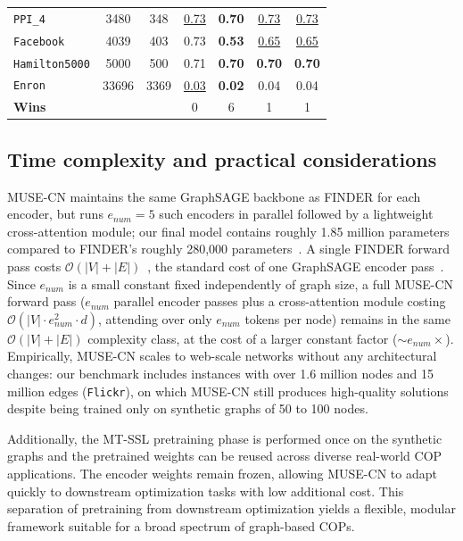 \documentclass{article}
\begin{document}
\begin{table}[!ht]
\begin{minipage}{0.49\linewidth}
{\begin{tabular}{l|c|c|c|c|c|c}
                        \texttt{PPI\_4} & 3480 & 348 & \underline{0.73} & \textbf{0.70} & \underline{0.73} & \underline{0.73} \\
                        \texttt{Facebook} & 4039 & 403 & 0.73 & \textbf{0.53} & \underline{0.65} & \underline{0.65} \\
                        \texttt{Hamilton5000} & 5000 & 500 & 0.71 & \textbf{0.70} & \textbf{0.70} & \textbf{0.70} \\
                        \texttt{Enron} & 33696 & 3369 & \underline{0.03} & \textbf{0.02} & 0.04 & 0.04 \\
                        \hline
                        \textbf{Wins} & &  & 0 & 6 & 1 & 1 \\
                        \end{tabular}
                    }
    \end{minipage}
    \end{table}



\subsection{Time complexity and practical considerations}
MUSE-CN maintains the same GraphSAGE backbone as FINDER for each encoder, but runs $e_{num}=5$ such encoders in parallel followed by a lightweight cross-attention module; our final model contains roughly 1.85 million parameters compared to FINDER’s roughly 280,000 parameters~\cite{fan2020finding}. A single FINDER forward pass costs $\mathcal{O}(|V|+|E|)$~\cite{fan2020finding}, the standard cost of one GraphSAGE encoder pass~\cite{hamilton2017inductive}. Since $e_{num}$ is a small constant fixed independently of graph size, a full MUSE-CN forward pass ($e_{num}$ parallel encoder passes plus a cross-attention module costing $\mathcal{O}(|V| \cdot e_{num}^2 \cdot d)$, attending over only $e_{num}$ tokens per node) remains in the same $\mathcal{O}(|V|+|E|)$ complexity class, at the cost of a larger constant factor ($\sim\!e_{num}\times$). Empirically, MUSE-CN scales to web-scale networks without any architectural changes: our benchmark includes instances with over 1.6 million nodes and 15 million edges (\texttt{Flickr}), on which MUSE-CN still produces high-quality solutions despite being trained only on synthetic graphs of 50 to 100 nodes.

Additionally, the MT-SSL pretraining phase is performed once on the synthetic graphs and the pretrained weights can be reused across diverse real-world COP applications. The encoder weights remain frozen, allowing MUSE-CN to adapt quickly to downstream optimization tasks with low additional cost. This separation of pretraining from downstream optimization yields a flexible, modular framework suitable for a broad spectrum of graph-based COPs.
        
\end{document}
